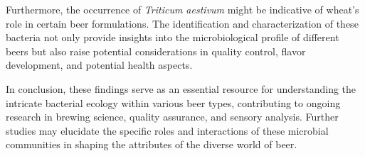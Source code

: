 Furthermore, the occurrence of \textit{Triticum aestivum} might be indicative of wheat's role in certain beer formulations. The identification and characterization of these bacteria not only provide insights into the microbiological profile of different beers but also raise potential considerations in quality control, flavor development, and potential health aspects.

In conclusion, these findings serve as an essential resource for understanding the intricate bacterial ecology within various beer types, contributing to ongoing research in brewing science, quality assurance, and sensory analysis. Further studies may elucidate the specific roles and interactions of these microbial communities in shaping the attributes of the diverse world of beer.
     